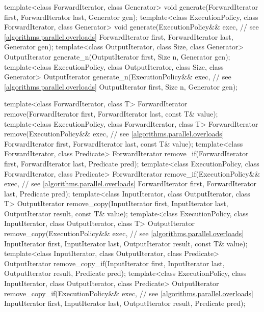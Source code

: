 \begin{codeblock}
{  template<class ForwardIterator, class Generator>
    void generate(ForwardIterator first, ForwardIterator last,
                  Generator gen);
  template<class ExecutionPolicy, class ForwardIterator, class Generator>
    void generate(ExecutionPolicy&& exec, // see \ref{algorithms.parallel.overloads}
                  ForwardIterator first, ForwardIterator last,
                  Generator gen);
  template<class OutputIterator, class Size, class Generator>
    OutputIterator generate_n(OutputIterator first, Size n, Generator gen);
  template<class ExecutionPolicy, class OutputIterator, class Size, class Generator>
    OutputIterator generate_n(ExecutionPolicy&& exec, // see \ref{algorithms.parallel.overloads}
                              OutputIterator first, Size n, Generator gen);

  template<class ForwardIterator, class T>
    ForwardIterator remove(ForwardIterator first, ForwardIterator last,
                           const T& value);
  template<class ExecutionPolicy, class ForwardIterator, class T>
    ForwardIterator remove(ExecutionPolicy&& exec, // see \ref{algorithms.parallel.overloads}
                           ForwardIterator first, ForwardIterator last,
                           const T& value);
  template<class ForwardIterator, class Predicate>
    ForwardIterator remove_if(ForwardIterator first, ForwardIterator last,
                              Predicate pred);
  template<class ExecutionPolicy, class ForwardIterator, class Predicate>
    ForwardIterator remove_if(ExecutionPolicy&& exec, // see \ref{algorithms.parallel.overloads}
                              ForwardIterator first, ForwardIterator last,
                              Predicate pred);
  template<class InputIterator, class OutputIterator, class T>
    OutputIterator remove_copy(InputIterator first, InputIterator last,
                               OutputIterator result, const T& value);
  template<class ExecutionPolicy, class InputIterator, class OutputIterator,
           class T>
    OutputIterator remove_copy(ExecutionPolicy&& exec, // see \ref{algorithms.parallel.overloads}
                               InputIterator first, InputIterator last,
                               OutputIterator result, const T& value);
  template<class InputIterator, class OutputIterator, class Predicate>
    OutputIterator remove_copy_if(InputIterator first, InputIterator last,
                                  OutputIterator result, Predicate pred);
  template<class ExecutionPolicy, class InputIterator, class OutputIterator,
           class Predicate>
    OutputIterator remove_copy_if(ExecutionPolicy&& exec, // see \ref{algorithms.parallel.overloads}
                                  InputIterator first, InputIterator last,
                                  OutputIterator result, Predicate pred);

}
\end{codeblock}
